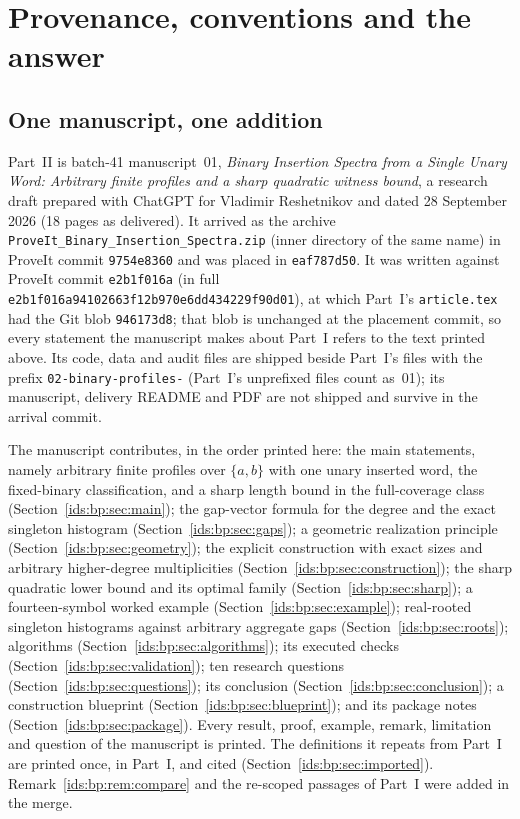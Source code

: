 \documentclass[11pt,letterpaper]{article}
\theoremstyle{definition}\newtheorem{definition}[theorem]{Definition}
\theoremstyle{remark}\newtheorem{remark}[theorem]{Remark}
\theoremstyle{definition}\newtheorem{question}[theorem]{Question}
\begin{document}
\section{Provenance, conventions and the answer}\label{ids:bp:sec:intro}

\subsection{One manuscript, one addition}\label{ids:bp:sec:source}

Part~II is batch-41 manuscript~01, \emph{Binary Insertion Spectra from a
Single Unary Word: Arbitrary finite profiles and a sharp quadratic witness
bound}, a research draft prepared with ChatGPT for Vladimir Reshetnikov and
dated 28 September 2026 (18 pages as delivered). It arrived as the archive
\texttt{ProveIt\_Binary\_Insertion\_Spectra.zip} (inner directory of the same
name) in ProveIt commit \texttt{9754e8360} and was placed in
\texttt{eaf787d50}. It was written against ProveIt commit
\texttt{e2b1f016a} (in full
\nolinkurl{e2b1f016a94102663f12b970e6dd434229f90d01}), at which Part~I's
\texttt{article.tex} had the Git blob \texttt{946173d8}; that blob is
unchanged at the placement commit, so every statement the manuscript makes
about Part~I refers to the text printed above. Its code, data and audit files
are shipped beside Part~I's files with the prefix
\nolinkurl{02-binary-profiles-} (Part~I's unprefixed files count as~01); its
manuscript, delivery README and PDF are not shipped and survive in the
arrival commit.

The manuscript contributes, in the order printed here: the main statements,
namely arbitrary finite profiles over $\{a,b\}$ with one unary inserted word,
the fixed-binary classification, and a sharp length bound in the full-coverage
class (Section~\ref{ids:bp:sec:main}); the gap-vector formula for the degree
and the exact singleton histogram (Section~\ref{ids:bp:sec:gaps}); a geometric
realization principle (Section~\ref{ids:bp:sec:geometry}); the explicit
construction with exact sizes and arbitrary higher-degree multiplicities
(Section~\ref{ids:bp:sec:construction}); the sharp quadratic lower bound and
its optimal family (Section~\ref{ids:bp:sec:sharp}); a fourteen-symbol worked
example (Section~\ref{ids:bp:sec:example}); real-rooted singleton histograms
against arbitrary aggregate gaps (Section~\ref{ids:bp:sec:roots}); algorithms
(Section~\ref{ids:bp:sec:algorithms}); its executed checks
(Section~\ref{ids:bp:sec:validation}); ten research questions
(Section~\ref{ids:bp:sec:questions}); its conclusion
(Section~\ref{ids:bp:sec:conclusion}); a construction blueprint
(Section~\ref{ids:bp:sec:blueprint}); and its package notes
(Section~\ref{ids:bp:sec:package}). Every result, proof, example, remark,
limitation and question of the manuscript is printed. The definitions it
repeats from Part~I are printed once, in Part~I, and cited
(Section~\ref{ids:bp:sec:imported}). Remark~\ref{ids:bp:rem:compare} and the
re-scoped passages of Part~I were added in the merge.
\end{document}
